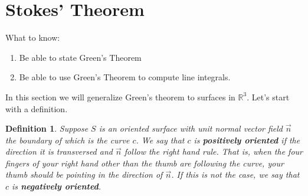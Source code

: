 \documentclass[12pt]{article}
\title{}
\newcommand{\R}{ \mathbb{R}}
\newcommand{\vn}{\vec{n}}
\newtheorem{defn}{Definition}
\begin{document}
\section*{Stokes' Theorem}
What to know:
\begin{enumerate}
\item Be able to state Green's Theorem
\item Be able to use Green's Theorem to compute line integrals.
\end{enumerate}




In this section we will generalize Green's theorem to surfaces in $\R^3$. Let's start with a definition. 
\begin{defn}
Suppose $S$ is an oriented surface with unit normal vector field $\vn$ the boundary of which is the curve $c$. We say that $c$ is \textbf{positively oriented} if the direction it is transversed and $\vn$ follow the right hand rule. That is, when the four fingers of your right hand other than the thumb are following the curve, your thumb should be pointing in the direction of $\vn$. If this is not the case, we say that $c$ is \textbf{negatively oriented}.
\end{defn}
\end{document}
